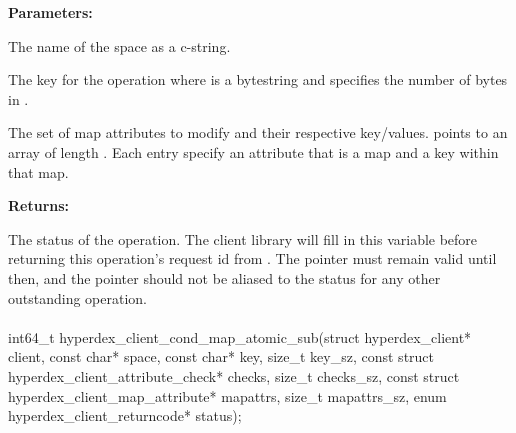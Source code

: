 \noindent\textbf{Parameters:}
\begin{description}[labelindent=\widthof{{\code{mapattrs}, \code{mapattrs\_sz}}},leftmargin=*,noitemsep,nolistsep,align=right]
\item[\code{space}] The name of the space as a c-string.
\item[\code{key}, \code{key\_sz}] The key for the operation where  is a bytestring and  specifies the number of bytes in .
\item[\code{mapattrs}, \code{mapattrs\_sz}] The set of map attributes to modify and their respective key/values.   points to an array of length .  Each entry specify an attribute that is a map and a key within that map.
\end{description}

\noindent\textbf{Returns:}
\begin{description}[labelindent=\widthof{{\code{status}}},leftmargin=*,noitemsep,nolistsep,align=right]
\item[\code{status}] The status of the operation.  The client library will fill in this variable before returning this operation's request id from .  The pointer must remain valid until then, and the pointer should not be aliased to the status for any other outstanding operation.
\end{description}

\paragraph{}
\begin{ccode}
int64_t hyperdex_client_cond_map_atomic_sub(struct hyperdex_client* client,
                const char* space,
                const char* key, size_t key_sz,
                const struct hyperdex_client_attribute_check* checks, size_t checks_sz,
                const struct hyperdex_client_map_attribute* mapattrs, size_t mapattrs_sz,
                enum hyperdex_client_returncode* status);
\end{ccode}
\funcdesc 

